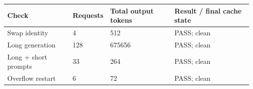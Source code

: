 \begin{tabular}{llll}
\toprule
Check & Requests & Total output tokens & Result / final cache state \\
\midrule
Swap identity & 4 & 512 & PASS; clean \\
Long generation & 128 & 675656 & PASS; clean \\
Long + short prompts & 33 & 264 & PASS; clean \\
Overflow restart & 6 & 72 & PASS; clean \\
\bottomrule
\end{tabular}
